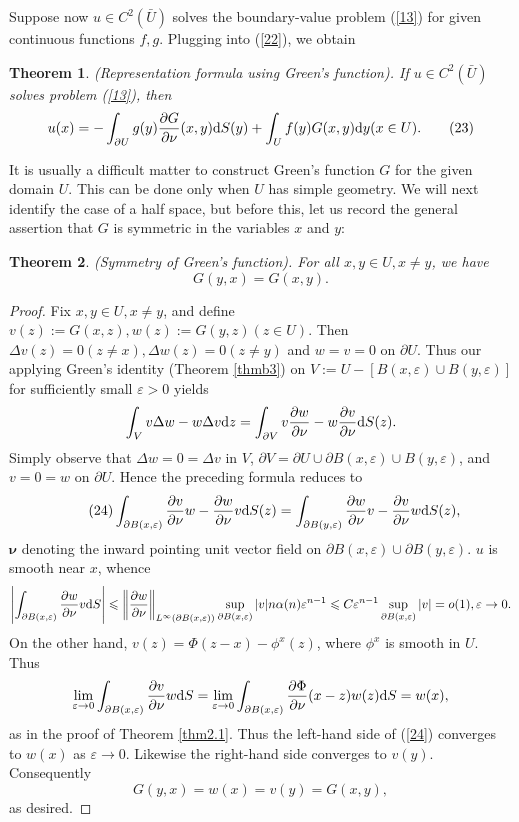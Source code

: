 \documentclass[hyperref,UTF8,12pt]{article}
\numberwithin{equation}{subsection}
\theoremstyle{plain}
\newtheorem{theorem}{Theorem}
\theoremstyle{definition}
\numberwithin{theorem}{section}
\numberwithin{lemma}{section}
\numberwithin{proposition}{section}
\numberwithin{remark}{section}
\numberwithin{corollary}{section}
\numberwithin{definition}{section}
\numberwithin{problem}{section}
\numberwithin{example}{section}
\def\dif{\textup{d}}
\newcommand{\ptl}{\partial}
\renewcommand{\leq}{\leqslant}
\newcommand{\ve}{\varepsilon}
\begin{document}
Suppose now $u\in C^2(\bar{U})$ solves the boundary-value problem (\ref{13}) for given continuous functions $f,g$. Plugging into (\ref{22}), we obtain
\begin{theorem}
(Representation formula using Green's function). If $u\in C^2(\bar{U})$ solves problem \textup{(\ref{13})}, then\[u(x)=-\int_{\ptl U}g(y)\frac{\ptl G}{\ptl\nu}(x,y)\dif S(y)+\int_Uf(y)G(x,y)\dif y(x\in U).\tag{23}\label{23}\]
\end{theorem}
It is usually a difficult matter to  construct Green's function $G$ for the given domain $U$. This can be done only when $U$ has simple geometry. We will next identify the case of a half space, but before this, let us record the general assertion that $G$ is symmetric in the variables $x$ and $y$:
\begin{theorem}
(Symmetry of Green's function). For all $x,y\in U,x\neq y$, we have\[G(y,x)=G(x,y).\]
\end{theorem}
\begin{proof}
Fix $x,y\in U,x\neq y$, and define $v(z):=G(x,z),w(z):=G(y,z)(z\in U)$. Then $\Delta v(z)=0(z\neq x),\Delta w(z)=0(z\neq y)$ and $w=v=0$ on $\ptl U$. Thus our applying Green's identity (Theorem \ref{thmb3}) on $V:=U-[B(x,\ve)\cup B(y,\ve)]$ for sufficiently small $\ve>0$ yields\[\int_Vv\Delta w-w\Delta v\dif z=\int_{\ptl V}v\frac{\ptl w}{\ptl\nu}-w\frac{\ptl v}{\ptl\nu}\dif S(z).\]Simply observe that $\Delta w=0=\Delta v$ in $V$, $\ptl V=\ptl U\cup\ptl B(x,\ve)\cup B(y,\ve)$, and $v=0=w$ on $\ptl U$. Hence the preceding formula reduces to\[\tag{24}\int_{\ptl B(x,\ve)}\frac{\ptl v}{\ptl\nu}w-\frac{\ptl w} {\ptl\nu}v\dif S(z)=\int_{\ptl B(y,\ve)}\frac{\ptl w}{\ptl\nu}v-\frac{\ptl v}{\ptl\nu}w \dif S(z),\label{24}\]$\bm{\nu}$ denoting the inward pointing unit vector field on $\ptl B(x,\ve)\cup \ptl B(y,\ve)$. $u$ is smooth near $x$, whence\[\left|\int_{\ptl B(x,\ve)} \frac{\ptl w}{\ptl\nu}v\dif S\right|\leq\left\|\frac{\ptl w}{\ptl\nu}\right\|_{L^\infty(\ptl B(x,\ve))}\sup_{\ptl B(x,\ve)}|v|n\alpha(n)\ve^{n-1}\leq C\ve^{n-1}\sup_{\ptl B(x,\ve)}|v|=o(1),\ve\to0.\]On the other hand, $v(z)=\Phi(z-x)-\phi^x(z)$, where $\phi^x$ is smooth in $U$. Thus\[\lim_{\ve\to0}\int_{\ptl B(x,\ve)}\frac{\ptl v}{\ptl\nu}w\dif S=\lim_{\ve\to0}\int_{\ptl B(x,\ve)}\frac{\ptl\Phi}{\ptl\nu}(x-z)w(z)\dif S=w(x),\]as in the proof of Theorem \ref{thm2.1}. Thus the left-hand side of (\ref{24}) converges to $w(x)$ as $\ve\to0$. Likewise the right-hand side converges to $v(y)$. Consequently\[G(y,x)=w(x)=v(y)=G(x,y),\]as desired.
\end{proof}
\end{document}
